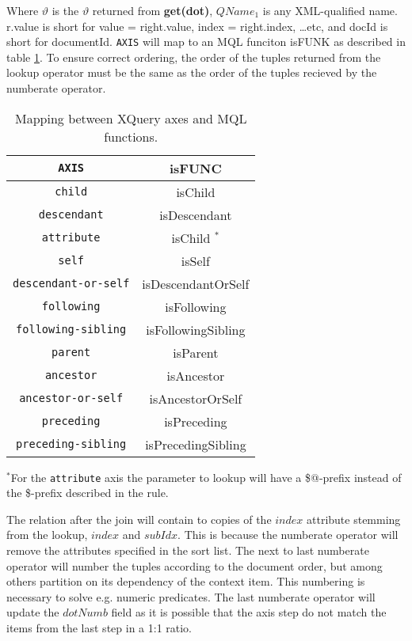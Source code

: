 Where $\vartheta$ is the $\vartheta$ returned from \textbf{get(dot)}, $QName_1$ is any XML-qualified name.
\textsf{r.value} is short for \textsf{value = right.value, index = right.index, \ldots etc}, and \textsf{docId} is
short for \textsf{documentId}. \texttt{AXIS} will map to an MQL funciton \textsf{isFUNK} as described in table
\ref{tab:trans:TD:axisMap}. To ensure correct ordering, the order of the tuples returned from the \textsf{lookup}
operator must be the same as the order of the tuples recieved by the \textsf{numberate} operator. 

\begin{table}[h]
\centering
\begin{tabular}{c|c}
\texttt{AXIS} & \textsf{isFUNC} \\ \hline
\texttt{child} & \textsf{isChild} \\
\texttt{descendant} & \textsf{isDescendant} \\
\texttt{attribute} & \textsf{isChild} $^{*}$ \\
\texttt{self} & \textsf{isSelf} \\
\texttt{descendant-or-self} & \textsf{isDescendantOrSelf} \\
\texttt{following} & \textsf{isFollowing} \\
\texttt{following-sibling} & \textsf{isFollowingSibling} \\
\texttt{parent} & \textsf{isParent} \\
\texttt{ancestor} & \textsf{isAncestor} \\
\texttt{ancestor-or-self} & \textsf{isAncestorOrSelf} \\
\texttt{preceding} & \textsf{isPreceding} \\
\texttt{preceding-sibling} & \textsf{isPrecedingSibling} 
\end{tabular}
\caption{Mapping between XQuery axes and MQL functions. \label{tab:trans:TD:axisMap}}
\end{table}

$^{*}$For the \texttt{attribute} axis the parameter to \textsf{lookup} will have a \textsf{\$@}-prefix
instead of the \textsf{\$}-prefix described in the rule.

The relation after the join will contain to copies of the $index$ attribute stemming from the lookup, $index$ and
$subIdx$. This is because the \textsf{numberate} operator will remove the attributes specified in the sort list.
The next to last \textsf{numberate} operator will number the tuples according to the document order, but among
others partition on its dependency of the context item. This numbering is necessary to solve e.g. numeric predicates. The
last \textsf{numberate} operator will update the $dotNumb$ field as it is possible that the axis step do not
match the items from the last step in a 1:1 ratio.

